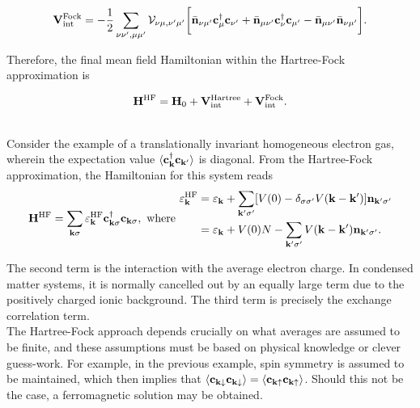 \documentclass{homework}
\begin{document}
\begin{equation}
    {\bf V}_{\textnormal{int}}^{\textnormal{Fock}} = - \frac{1}{2} \sum_{\nu\nu', \mu\mu'} {\mathcal V}_{\nu\mu, \nu'\mu'} \bigg[ \bar{\bf n}_{\nu \mu'} {\bf c}_{\mu}^\dagger {\bf c}_{\nu'} + \bar{\bf n}_{\mu \nu'} {\bf c}_{\nu}^\dagger {\bf c}_{\mu'} - \bar{\bf n}_{\mu \nu'} \bar{\bf n}_{\nu \mu'}\bigg].
\end{equation}

Therefore, the final mean field Hamiltonian within the Hartree-Fock approximation is 

\begin{equation}
    {\bf H}^{\textnormal{HF}} = {\bf H}_0 + {\bf V}_{\textnormal{int}}^{\textnormal{Hartree}} + {\bf V}_{\textnormal{int}}^{\textnormal{Fock}}.
\end{equation}

\blanky \\

Consider the example of a translationally invariant homogeneous electron gas, wherein the expectation value $\langle {\bf c}_{\bf k}^\dagger {\bf c}_{\bf k'} \rangle$ is diagonal. From the Hartree-Fock approximation, the Hamiltonian for this system reads 
\begin{align}
    {\bf H}^{\textnormal{HF}} = \sum_{{\bf k} \sigma} \varepsilon_{\bf k}^{\textnormal{HF}} {\bf c}_{{\bf k} \sigma}^\dagger {\bf c}_{{\bf k} \sigma}, \textnormal{ where } \begin{split}
        \varepsilon_{\bf k}^{\textnormal{HF}} &= \varepsilon_{\bf k} + \sum_{{\bf k}' \sigma'} [V(0) - \delta_{\sigma\sigma'} V({\bf k}- {\bf k}')] {\bf n}_{{\bf k}' \sigma'} \\
        &= \varepsilon_{\bf k} + V(0) N - \sum_{{\bf k}' \sigma'} V({\bf k}- {\bf k}') {\bf n}_{{\bf k'} \sigma'}.
    \end{split}
\end{align}

The second term is the interaction with the average electron charge. In condensed matter systems, it is normally cancelled out by an equally large term due to the positively charged ionic background. The third term is precisely the exchange correlation term. \\

The Hartree-Fock approach depends crucially on what averages are assumed to be finite, and these assumptions must be based on physical knowledge or clever guess-work. For example, in the previous example, spin symmetry is assumed to be maintained, which then implies that $\langle {\bf c}_{{\bf k} \downarrow} {\bf c}_{{\bf k}\downarrow} \rangle = \langle {\bf c}_{{\bf k} \uparrow} {\bf c}_{{\bf k}\uparrow} \rangle$. Should this not be the case, a ferromagnetic solution may be obtained. \\
\end{document}
